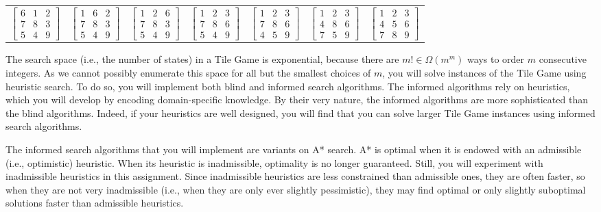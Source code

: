 \documentclass{article}
\begin{document}
\begin{tabular}{ccccccc}
$\begin{bmatrix}
6 & 1 & 2 \\
7 & 8 & 3 \\
5 & 4 & 9
\end{bmatrix}$
&
$\begin{bmatrix}
1 & 6 & 2 \\
7 & 8 & 3 \\
5 & 4 & 9
\end{bmatrix}$
&
$\begin{bmatrix}
1 & 2 & 6 \\
7 & 8 & 3 \\
5 & 4 & 9
\end{bmatrix}$
&
$\begin{bmatrix}
1 & 2 & 3 \\
7 & 8 & 6 \\
5 & 4 & 9
\end{bmatrix}$
&  
$\begin{bmatrix}
1 & 2 & 3 \\
7 & 8 & 6 \\
4 & 5 & 9
\end{bmatrix}$
&  
$\begin{bmatrix}
1 & 2 & 3 \\
4 & 8 & 6 \\
7 & 5 & 9
\end{bmatrix}$
&
$\begin{bmatrix}
1 & 2 & 3 \\
4 & 5 & 6 \\
7 & 8 & 9
\end{bmatrix}$ \\ [5ex]
\end{tabular}

The search space (i.e., the number of states) in a Tile Game is
exponential, because there are $m! \in \Omega(m^m)$ ways to order $m$
consecutive integers.  As we cannot possibly enumerate this space for
all but the smallest choices of $m$, you will solve instances of the
Tile Game using heuristic search.  To do so, you will implement both
blind and informed search algorithms.  The informed algorithms rely on
heuristics, which you will develop by encoding domain-specific
knowledge.  By their very nature, the informed algorithms are more
sophisticated than the blind algorithms.  Indeed, if your heuristics
are well designed, you will find that you can solve larger Tile Game
instances using informed search algorithms.

The informed search algorithms that you will implement are variants on
A* search.  A* is optimal when it is endowed with an admissible (i.e.,
optimistic) heuristic.  When its heuristic is inadmissible, optimality
is no longer guaranteed.  Still, you will experiment with inadmissible
heuristics in this assignment.  Since inadmissible heuristics are less
constrained than admissible ones, they are often faster, so when they
are not very inadmissible (i.e., when they are only ever slightly
pessimistic), they may find optimal or only slightly suboptimal
solutions faster than admissible heuristics.
\end{document}
